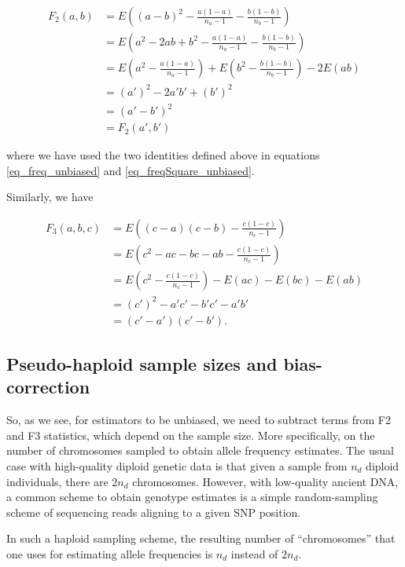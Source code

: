 \documentclass{article}
\begin{document}
\begin{equation}
\begin{split}
F_2(a,b) &= E\left( (a-b)^2-\frac{a(1-a)}{n_a-1}-\frac{b(1-b)}{n_b-1}\right) \\
&= E\left( a^2-2a b+b^2-\frac{a(1-a)}{n_a-1}-\frac{b(1-b)}{n_b-1}\right)\\
&= E\left( a^2-\frac{a(1-a)}{n_a-1}\right) +E\left( b^2-\frac{b(1-b)}{n_b-1}\right) -2 E(a b) \\
&=(a')^2-2 a' b' +(b')^2\\
&=(a'-b')^2\\
&=F_2(a',b')
\end{split}
\end{equation}

where we have used the two identities defined above in equations \ref{eq_freq_unbiased} and \ref{eq_freqSquare_unbiased}.

Similarly, we have

\begin{equation}
\begin{split}
F_3(a,b,c) &= E\left( (c-a)(c-b)-\frac{c(1-c)}{n_c-1}\right) \\
&= E\left( c^2-a c- b c - a b-\frac{c(1-c)}{n_c-1}\right) \\
&= E\left( c^2-\frac{c(1-c)}{n_c-1}\right) -E(a c) -E(b c)  -E( a b) \\
&= (c')^2-a' c'-b'c'-a'b'\\
&= (c'-a')(c'-b').
\end{split}
\end{equation}

\subsection{Pseudo-haploid sample sizes and bias-correction}

So, as we see, for estimators to be unbiased, we need to subtract terms from F2 and F3 statistics, which depend on the sample size. More specifically, on the number of chromosomes sampled to obtain allele frequency estimates. The usual case with high-quality diploid genetic data is that given a sample from \(n_d\) diploid individuals, there are \(2n_d\) chromosomes. However, with low-quality ancient DNA, a common scheme to obtain genotype estimates is a simple random-sampling scheme of sequencing reads aligning to a given SNP position.

In such a haploid sampling scheme, the resulting number of {``}chromosomes{''} that one uses for estimating allele frequencies is \(n_d\) instead of \(2n_d\). 
\end{document}
